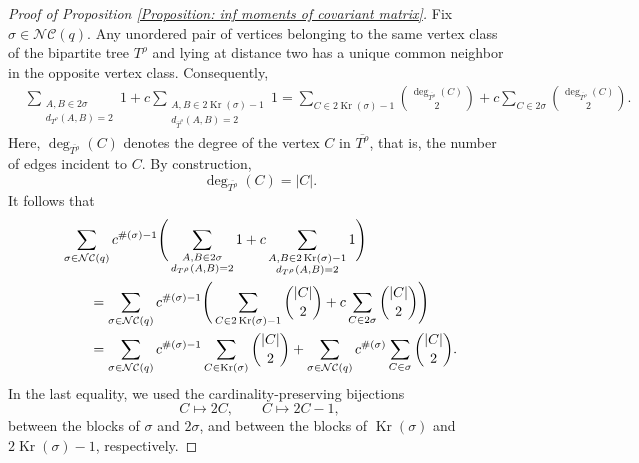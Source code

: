 \documentclass{article}
\theoremstyle{definition}
\newcommand{\NC}{\mathcal{NC}}
\begin{document}
{\begin{proof}[Proof of Proposition \ref{Proposition: inf moments of covariant matrix}]
Fix \(\sigma\in\NC(q)\). Any unordered pair of vertices belonging
to the same vertex class of the bipartite tree \(T^\rho\) and lying
at distance two has a unique common neighbor in the opposite vertex
class. Consequently,
\begin{align*}
&
\sum_{\substack{A,B\in 2\sigma\\
d_{T^\rho}(A,B)=2}}
1
+
c\sum_{\substack{A,B\in
2\operatorname{Kr}(\sigma)-1\\
d_{\bar{T}^\rho}(A,B)=2}}
1
=
\sum_{C\in 2\operatorname{Kr}(\sigma)-1}
\binom{\deg_{\overline{T^\rho}}(C)}{2}
+
c\sum_{C\in 2\sigma}
\binom{\deg_{\overline{T^\rho}}(C)}{2}.
\end{align*}
Here, \(\deg_{\overline{T^\rho}}(C)\) denotes the degree of the vertex \(C\)
in \(\overline{T^\rho}\), that is, the number of edges incident to \(C\).
By construction,
\[
\deg_{\overline{T^\rho}}(C)=|C|.
\]
It follows that
\begin{align}
&\sum_{\sigma\in\NC(q)}
c^{\#(\sigma)-1}
\Bigg(
\sum_{\substack{A,B\in 2\sigma\\
d_{T^\rho}(A,B)=2}}
1
+
c\sum_{\substack{A,B\in
2\operatorname{Kr}(\sigma)-1\\
d_{T^\rho}(A,B)=2}}
1
\Bigg)
\notag\\
&\qquad=
\sum_{\sigma\in\NC(q)}
c^{\#(\sigma)-1}
\Bigg(
\sum_{C\in 2\operatorname{Kr}(\sigma)-1}
\binom{|C|}{2}
+
c\sum_{C\in 2\sigma}
\binom{|C|}{2}
\Bigg)
\notag\\
&\qquad=
\sum_{\sigma\in\NC(q)}
c^{\#(\sigma)-1}
\sum_{C\in\operatorname{Kr}(\sigma)}
\binom{|C|}{2}
+
\sum_{\sigma\in\NC(q)}
c^{\#(\sigma)}
\sum_{C\in\sigma}
\binom{|C|}{2}.
\label{eq:inf-moments-covariance}
\end{align}
In the last equality, we used the cardinality-preserving bijections
\[
C\longmapsto 2C,
\qquad
C\longmapsto 2C-1,
\]
between the blocks of \(\sigma\) and \(2\sigma\), and between the
blocks of \(\operatorname{Kr}(\sigma)\) and
\(2\operatorname{Kr}(\sigma)-1\), respectively.


\end{proof}}
\end{document}

